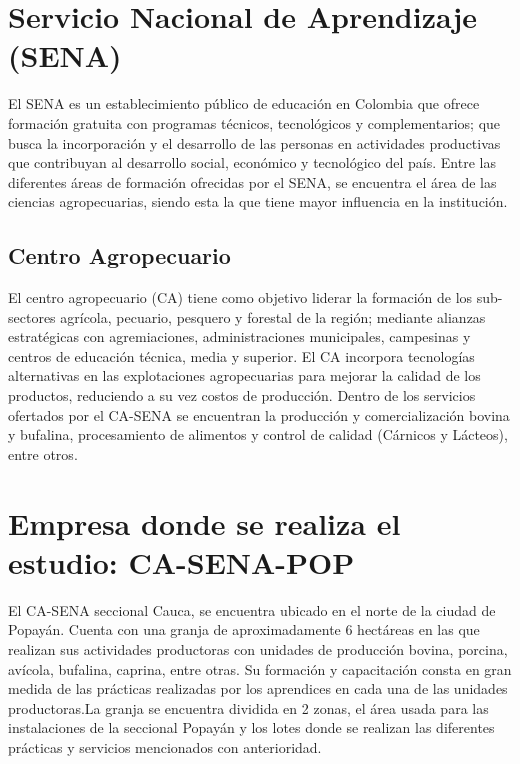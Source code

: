 

\section{Servicio Nacional de Aprendizaje (SENA)}

El SENA es un establecimiento público de educación en Colombia que ofrece formación gratuita con programas técnicos, tecnológicos y complementarios; que busca la incorporación y el desarrollo de las personas en actividades productivas que contribuyan al desarrollo social, económico y tecnológico del país. Entre las diferentes áreas de formación ofrecidas por el SENA, se encuentra el área de las ciencias agropecuarias, siendo esta la que tiene mayor influencia en la institución.\cite{sena}


\subsection{Centro Agropecuario}

El centro agropecuario (CA) tiene como objetivo liderar la formación de los sub-sectores agrícola, pecuario, pesquero y forestal de la región; mediante alianzas estratégicas con agremiaciones, administraciones municipales, campesinas y centros de educación técnica, media y superior. El CA incorpora tecnologías alternativas en las explotaciones agropecuarias para mejorar la calidad de los productos, reduciendo a su vez costos de producción. Dentro de los servicios ofertados por el CA-SENA se encuentran la producción y comercialización bovina y bufalina, procesamiento de alimentos y control de calidad (Cárnicos y Lácteos), entre otros\cite{casena}.

\section{Empresa donde se realiza el estudio: CA-SENA-POP}

El CA-SENA seccional Cauca, se encuentra ubicado en el norte de la ciudad de Popayán. Cuenta con una granja de aproximadamente 6 hectáreas en las que realizan sus actividades productoras con unidades de producción bovina, porcina, avícola, bufalina, caprina, entre otras. Su formación y capacitación consta en gran medida de las prácticas realizadas por los aprendices en cada una de las unidades productoras.La granja se encuentra dividida en 2 zonas, el área usada para las instalaciones de la seccional Popayán y los lotes donde se realizan las diferentes prácticas y servicios mencionados con anterioridad.

